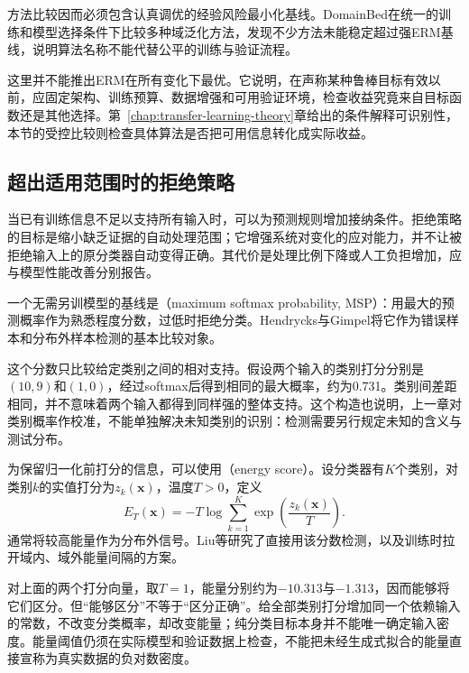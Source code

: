 方法比较因而必须包含认真调优的经验风险最小化基线。DomainBed在统一的训练和模型选择条件下比较多种域泛化方法，发现不少方法未能稳定超过强ERM基线，说明算法名称不能代替公平的训练与验证流程。

这里并不能推出ERM在所有变化下最优。它说明，在声称某种鲁棒目标有效以前，应固定架构、训练预算、数据增强和可用验证环境，检查收益究竟来自目标函数还是其他选择。第~\ref{chap:transfer-learning-theory}章给出的条件解释可识别性，本节的受控比较则检查具体算法是否把可用信息转化成实际收益。

\subsection{超出适用范围时的拒绝策略}
\label{sec:robustness-rejection}

当已有训练信息不足以支持所有输入时，可以为预测规则增加接纳条件。拒绝策略的目标是缩小缺乏证据的自动处理范围；它增强系统对变化的应对能力，并不让被拒绝输入上的原分类器自动变得正确。其代价是处理比例下降或人工负担增加，应与模型性能改善分别报告。

一个无需另训模型的基线是（maximum softmax probability, MSP）：用最大的预测概率作为熟悉程度分数，过低时拒绝分类。Hendrycks与Gimpel将它作为错误样本和分布外样本检测的基本比较对象。

这个分数只比较给定类别之间的相对支持。假设两个输入的类别打分分别是$(10,9)$和$(1,0)$，经过softmax后得到相同的最大概率，约为0.731。类别间差距相同，并不意味着两个输入都得到同样强的整体支持。这个构造也说明，上一章对类别概率作校准，不能单独解决未知类别的识别：检测需要另行规定未知的含义与测试分布。

为保留归一化前打分的信息，可以使用（energy score）。设分类器有$K$个类别，对类别$k$的实值打分为$z_k(\bm{x})$，温度$T>0$，定义
\begin{equation}
 E_T(\bm{x})=-T\log\sum_{k=1}^{K}
       \exp\!\left(\frac{z_k(\bm{x})}{T}\right).
 \label{eq:robustness-energy}
\end{equation}
通常将较高能量作为分布外信号。Liu等研究了直接用该分数检测，以及训练时拉开域内、域外能量间隔的方案。

对上面的两个打分向量，取$T=1$，能量分别约为$-10.313$与$-1.313$，因而能够将它们区分。但“能够区分”不等于“区分正确”。给全部类别打分增加同一个依赖输入的常数，不改变分类概率，却改变能量；纯分类目标本身并不能唯一确定输入密度。能量阈值仍须在实际模型和验证数据上检查，不能把未经生成式拟合的能量直接宣称为真实数据的负对数密度。

